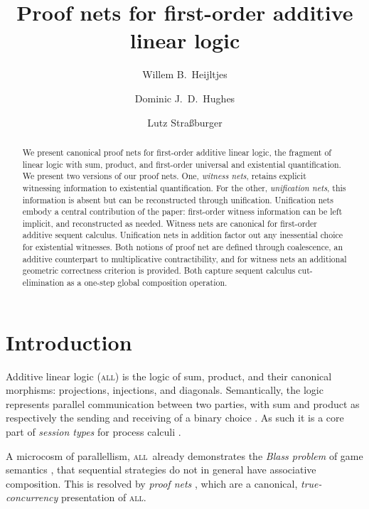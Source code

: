\documentclass[a4paper,UKenglish]{lipics-v2019}
\title{Proof nets for first-order additive linear logic}
\author
 {Willem B.\ Heijltjes}
 {University of Bath, United Kingdom\and\url{http://willem.heijltj.es}}
 {} %
 {}
 {was supported by EPSRC Project EP/R029121/1 \emph{Typed Lambda-Calculi with Sharing and Unsharing}.}
\author
 {Dominic J.\ D.\ Hughes}
 {Logic Group, UC Berkeley, USA\and\url{http://boole.stanford.edu/~dominic}}
 {} %
 {}
 {}
\author
 {Lutz Stra\ss burger}
 {Inria Saclay, Palaiseau, France\and LIX, \'Ecole Polytechnique, Palaiseau, France\and \url{http://www.lix.polytechnique.fr/Labo/Lutz.Strassburger}}
 {}
 {}
 {was supported by the ANR-FWF international grant ANR-5-CE25-0014 \emph{The Fine Structure of Formal Proof Systems and their Computational Interpretations (FISP)}.}
\newcommand\all{\textsc{all}}
\newcommand\+{+}
\renewcommand\*{\times}
\begin{document}
\maketitle

\begin{abstract}
We present canonical proof nets for first-order additive linear logic, the fragment of linear logic with sum, product, and first-order universal and existential quantification. 
%
We present two versions of our proof nets. One, \emph{witness nets}, retains explicit witnessing information to existential quantification. For the other, \emph{unification nets}, this information is absent but can be reconstructed through unification. Unification nets embody a central contribution of the paper: first-order witness information can be left implicit, and reconstructed as needed. 
%
Witness nets are canonical for first-order additive sequent calculus. Unification nets in addition factor out any inessential choice for existential witnesses. Both notions of proof net are defined through coalescence, an additive counterpart to multiplicative contractibility, and for witness nets an additional geometric correctness criterion is provided. 
% 
Both capture sequent calculus cut-elimination as a one-step global composition operation.
\end{abstract}



\section{Introduction}

Additive linear logic (\all) is the logic of sum, product, and their canonical morphisms: projections, injections, and diagonals. Semantically, the logic represents parallel communication between two parties, with sum and product as respectively the sending and receiving of a binary choice \cite{Joyal-1995, Cockett-Santocanale-2009}. As such it is a core part of \emph{session types} for process calculi \cite{Honda-Vasconcelos-Kubo-1998, Caires-Pfenning-2010, Wadler-2014}.

A microcosm of parallellism, \all\ already demonstrates the \emph{Blass problem} of game semantics \cite{Abramsky-2003}, that sequential strategies do not in general have associative composition. This is resolved by \emph{proof nets} \cite{Girard-1987,Hughes-vanGlabbeek-2005}, which are a canonical, \emph{true-concurrency} presentation of \all.
\end{document}
